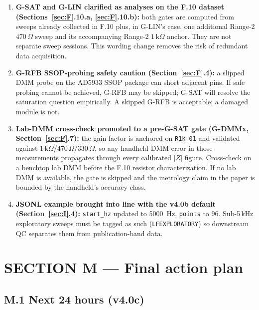 \documentclass[11pt,a4paper]{article}
\newcommand{\kohm}[1]{\ensuremath{#1\,\mathrm{k}\Omega}}
\newcommand{\Rohm}[1]{\ensuremath{#1\,\Omega}}
\begin{document}
\begin{enumerate}[leftmargin=1.5em]
\item \textbf{G-SAT and G-LIN clarified as analyses on the F.10 dataset (Sections~\ref{sec:F}.10.a, \ref{sec:F}.10.b):} both gates are computed from sweeps already collected in F.10 plus, in G-LIN's case, one additional Range-2 \Rohm{470} sweep and its accompanying Range-2 \kohm{1} anchor. They are not separate sweep sessions. This wording change removes the risk of redundant data acquisition.
\item \textbf{G-RFB SSOP-probing safety caution (Section~\ref{sec:F}.4):} a slipped DMM probe on the AD5933 SSOP package can short adjacent pins. If safe probing cannot be achieved, G-RFB may be skipped; G-SAT will resolve the saturation question empirically. A skipped G-RFB is acceptable; a damaged module is not.
\item \textbf{Lab-DMM cross-check promoted to a pre-G-SAT gate (G-DMMx, Section~\ref{sec:F}.7):} the gain factor is anchored on \texttt{R1k\_01} and validated against \kohm{1}/\Rohm{470}/\Rohm{330}, so any handheld-DMM error in those measurements propagates through every calibrated $|Z|$ figure. Cross-check on a benchtop lab DMM before the F.10 resistor characterization. If no lab DMM is available, the gate is skipped and the metrology claim in the paper is bounded by the handheld's accuracy class.
\item \textbf{JSONL example brought into line with the v4.0b default (Section~\ref{sec:I}.4):} \texttt{start\_hz} updated to \SI{5000}{\hertz}, \texttt{points} to 96. Sub-5\,kHz exploratory sweeps must be tagged as such (\texttt{LFEXPLORATORY}) so downstream QC separates them from publication-band data.
\end{enumerate}

\section{SECTION M --- Final action plan}
\label{sec:M}

\subsection{M.1 Next 24 hours (v4.0c)}
\end{document}
